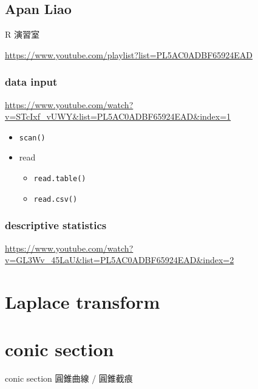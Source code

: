 \documentclass[
]{book}
\providecommand{\tightlist}{%
  \setlength{\itemsep}{0pt}\setlength{\parskip}{0pt}}
\theoremstyle{definition}
\theoremstyle{definition}
\theoremstyle{definition}
\theoremstyle{definition}
\theoremstyle{remark}
\begin{document}
\hypertarget{apan-liao}{%
\section{Apan Liao}\label{apan-liao}}

\begin{CJK}{UTF8}{bsmi}
R 演習室
\end{CJK}

\url{https://www.youtube.com/playlist?list=PL5AC0ADBF65924EAD}

\hypertarget{data-input}{%
\subsection{data input}\label{data-input}}

\url{https://www.youtube.com/watch?v=STcIxf_vUWY\&list=PL5AC0ADBF65924EAD\&index=1}

\begin{itemize}
\tightlist
\item
  \texttt{scan()}
\item
  read

  \begin{itemize}
  \tightlist
  \item
    \texttt{read.table()}
  \item
    \texttt{read.csv()}
  \end{itemize}
\end{itemize}

\hypertarget{descriptive-statistics}{%
\subsection{descriptive statistics}\label{descriptive-statistics}}

\url{https://www.youtube.com/watch?v=GL3Wv_45LaU\&list=PL5AC0ADBF65924EAD\&index=2}

\hypertarget{laplace-transform}{%
\chapter{Laplace transform}\label{laplace-transform}}

\hypertarget{conic-section}{%
\chapter{conic section}\label{conic-section}}

\begin{CJK}{UTF8}{bsmi}
conic section 圓錐曲線 / 圓錐截痕
\end{CJK}
\end{document}
